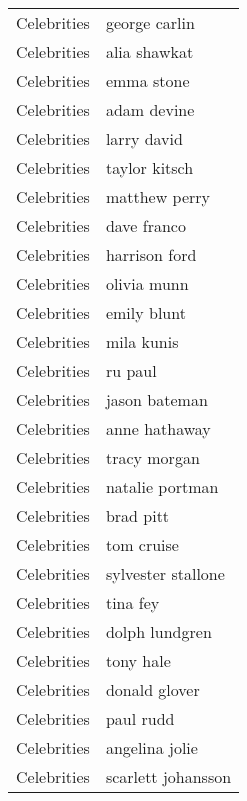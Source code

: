 \begin{supertabular}{l p{0.25\textwidth}}
      Celebrities &                      george carlin \\
      Celebrities &                       alia shawkat \\
      Celebrities &                         emma stone \\
      Celebrities &                        adam devine \\
      Celebrities &                        larry david \\
      Celebrities &                      taylor kitsch \\
      Celebrities &                      matthew perry \\
      Celebrities &                        dave franco \\
      Celebrities &                      harrison ford \\
      Celebrities &                        olivia munn \\
      Celebrities &                        emily blunt \\
      Celebrities &                         mila kunis \\
      Celebrities &                            ru paul \\
      Celebrities &                      jason bateman \\
      Celebrities &                      anne hathaway \\
      Celebrities &                       tracy morgan \\
      Celebrities &                    natalie portman \\
      Celebrities &                          brad pitt \\
      Celebrities &                         tom cruise \\
      Celebrities &                 sylvester stallone \\
      Celebrities &                           tina fey \\
      Celebrities &                     dolph lundgren \\
      Celebrities &                          tony hale \\
      Celebrities &                      donald glover \\
      Celebrities &                          paul rudd \\
      Celebrities &                     angelina jolie \\
      Celebrities &                 scarlett johansson \\

\end{supertabular}
